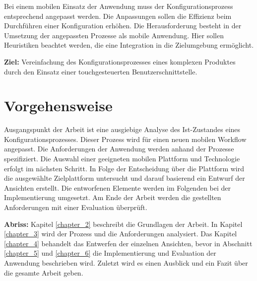 Bei einem mobilen Einsatz der Anwendung muss der Konfigurationsprozess entsprechend angepasst werden. Die Anpassungen sollen die Effizienz beim Durchführen einer Konfiguration erhöhen. Die Herausforderung besteht in der Umsetzung der angepassten Prozesse als mobile Anwendung. Hier sollen Heuristiken beachtet werden, die eine Integration in die Zielumgebung ermöglicht. 



\begin{mdframed}[backgroundcolor=gray!40,shadow=true,roundcorner=8pt]
\textbf{Ziel:} \newline
Vereinfachung des Konfigurationsprozesses eines komplexen Produktes durch den Einsatz einer touchgesteuerten Benutzerschnittstelle.
\end{mdframed}

\section{Vorgehensweise}
Ausgangspunkt der Arbeit ist eine ausgiebige Analyse des Ist-Zustandes eines Konfigurationsprozesses. Dieser Prozess wird für einen neuen mobilen Workflow angepasst. Die Anforderungen der Anwendung werden anhand der Prozesse spezifiziert. Die Auswahl einer geeigneten mobilen Plattform und Technologie erfolgt im nächsten Schritt. In Folge der Entscheidung über die Plattform wird die ausgewählte Zielplattform untersucht und darauf basierend ein Entwurf der Ansichten erstellt. Die entworfenen Elemente werden im Folgenden bei der Implementierung umgesetzt. Am Ende der Arbeit werden die gestellten Anforderungen mit einer Evaluation überprüft.
\par
\textbf{Abriss: }
Kapitel \ref{chapter_2} beschreibt die Grundlagen der Arbeit. In Kapitel \ref{chapter_3} wird der Prozess und die Anforderungen analysiert. Das Kapitel \ref{chapter_4} behandelt das Entwerfen der einzelnen Ansichten, bevor in Abschnitt \ref{chapter_5} und \ref{chapter_6} die Implementierung und Evaluation der Anwendung beschrieben wird. Zuletzt wird es einen Ausblick und ein Fazit über die gesamte Arbeit geben.







